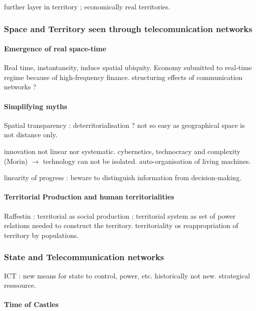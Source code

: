 further layer in territory ; economically real territories.

\subsubsection*{Space and Territory seen through telecomunication networks}

\paragraph{Emergence of real space-time}

Real time, instantaneity, induce spatial ubiquity. Economy submitted to real-time regime because of high-frequency finance. structuring effects of communication networks ?

\paragraph{Simplifying myths}

Spatial transparency : deterritorialisation ? not so easy as geographical space is not distance only.

innovation not linear nor systematic. cybernetics, technocracy and complexity (Morin) $\rightarrow$ technology can not be isolated. auto-organisation of living machines.

linearity of progress : beware to distinguish information from decision-making.


\paragraph{Territorial Production and human territorialities}

Raffestin : territorial as social production ; territorial system as set of power relations needed to construct the territory. territoriality os reappropriation of territory by populations.

\subsubsection*{State and Telecommunication networks}

ICT : new means for state to control, power, etc. historically not new. strategical resssource.

\paragraph{Time of Castles}

